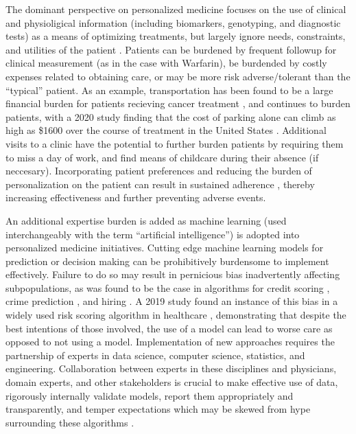 The dominant perspective on personalized medicine focuses on the use of clinical and physioligical information (including biomarkers, genotyping, and diagnostic tests) as a means of optimizing treatments, but largely ignore needs, constraints, and utilities of the patient \cite{rogowski2015concepts, di2017personalized}. Patients can be burdened by frequent followup for clinical measurement (as in the case with Warfarin), be burdended by costly expenses related to obtaining care, or may be more risk adverse/tolerant than the ``typical'' patient. As an example, transportation has been found to be a large financial burden for patients recieving cancer treatment \cite{houts1984nonmedical}, and continues to burden patients, with a 2020 study finding that the cost of parking alone can climb as high as \$1600 over the course of treatment in the United States \cite{lee2020assessment}.  Additional visits to a clinic have the potential to further burden patients by requiring them to miss a day of work, and find means of childcare during their absence (if neccesary). Incorporating patient preferences and reducing the burden of personalization on the patient can result in sustained adherence \cite{elliott2008understanding}, thereby increasing effectiveness and further preventing adverse events.



An additional expertise burden is added as machine learning (used interchangeably with the term “artificial intelligence”) is adopted into personalized medicine initiatives.  Cutting edge machine learning models for prediction or decision making can be prohibitively burdensome to implement effectively. Failure to do so may result in pernicious bias inadvertently affecting subpopulations, as was found to be the case in algorithms for credit scoring \cite{barocas2016big}, crime prediction \cite{lum2016predict}, and hiring \cite{ajunwa2020paradox}.  A 2019 study found an instance of this bias in a widely used risk scoring algorithm in healthcare \cite{obermeyer2019dissecting}, demonstrating that despite the best intentions of those involved, the use of a model can lead to worse care as opposed to not using a model. Implementation of new approaches requires the partnership of experts in data science, computer science, statistics, and engineering.  Collaboration between experts in these disciplines and physicians, domain experts, and other stakeholders is crucial to make effective use of data, rigorously internally validate models, report them appropriately and transparently, and temper expectations which may be skewed from hype surrounding these algorithms \cite{frohlich2018hype}. 


